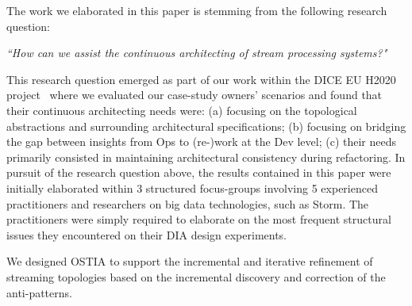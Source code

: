 
The work we elaborated in this paper is stemming from the following research question:

\begin{center}
\emph{``How can we assist the continuous architecting of stream processing systems?"}
\end{center}

This research question emerged as part of our work within the DICE EU H2020 project~\cite{dice2020}
where we evaluated our case-study owners' scenarios and found that their continuous architecting needs were: (a) focusing on the topological abstractions and surrounding architectural specifications; (b) focusing on bridging the gap between insights from Ops to (re-)work at the Dev level; (c) their needs primarily consisted in maintaining architectural consistency during refactoring.
In pursuit of the research question above, the results contained in this paper were initially elaborated within 3 structured focus-groups \cite{focusgroup} involving 5 experienced practitioners and researchers on big data technologies, such as Storm. The practitioners were simply required to elaborate on the most frequent structural issues they encountered on their DIA design experiments.

We designed OSTIA
to support the incremental and iterative refinement of streaming topologies based on the incremental discovery and correction of the anti-patterns.

